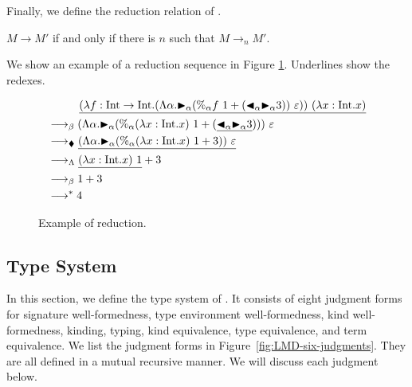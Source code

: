 Finally, we define the reduction relation of \LMD.

\begin{definition}
    \( M \longrightarrow M' \) if and only if there is \( n \) such that \( M
    \longrightarrow_n M' \).
\end{definition}

We show an example of a reduction sequence in Figure \ref{fig:example-of-reduction}. Underlines show the redexes.

\begin{figure}[tbp]
\begin{align*}
    & \hspace{10mm} \underline{(\lambda f:\I\to\I.(\Lambda\alpha.\TB_\alpha (\%_\alpha f\ 1 + (\TBL_\alpha \TB_\alpha 3))\ \varepsilon))\ (\lambda x:\I.x)} \\
    & \longrightarrow_\beta (\Lambda\alpha.\TB_\alpha (\%_\alpha (\lambda x:\I.x)\ 1 + (\underline{\TBL_\alpha \TB_\alpha 3})))\ \varepsilon        \\
    & \longrightarrow_\blacklozenge \underline{(\Lambda\alpha.\TB_\alpha (\%_\alpha (\lambda x:\I.x)\ 1 + 3))\ \varepsilon}                                         \\
    & \longrightarrow_\Lambda \underline{(\lambda x:\I.x)\ 1} + 3                                                                                           \\
    & \longrightarrow_\beta 1 + 3                                                                                                                           \\
    & \longrightarrow^* 4
\end{align*}
    \caption{Example of reduction.}
    \label{fig:example-of-reduction}
\end{figure}

\subsection{Type System}

In this section, we define the type system of \LMD.  It consists of eight
judgment forms for signature well-formedness, type environment well-formedness,
kind well-formedness, kinding, typing, kind equivalence, type equivalence, and
term equivalence.  We list the judgment forms in
Figure~\ref{fig:LMD-six-judgments}.  They are all defined in a mutual recursive
manner.  We will discuss each judgment below.

